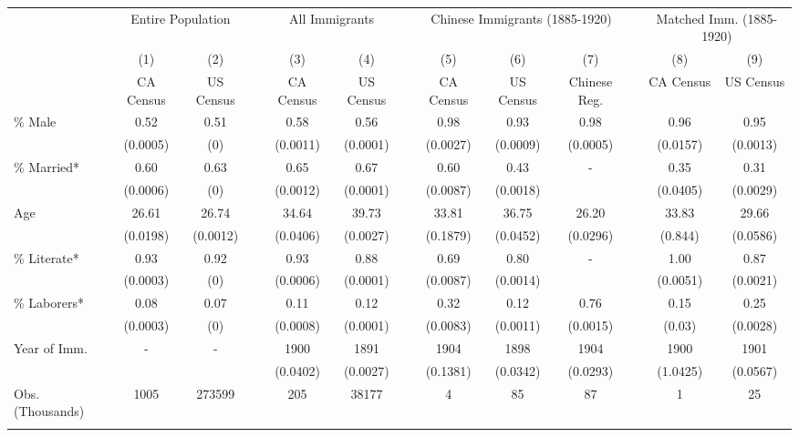 \begin{tabular}{lcccccccccccc}
\hhline{=============}
& \multicolumn{2}{c}{Entire Population} & & \multicolumn{2}{c}{All Immigrants} & & \multicolumn{3}{c}{Chinese Immigrants (1885-1920)} & & \multicolumn{2}{c}{Matched Imm. (1885-1920)} \\ 
\hhline{~--~--~---~--}
& (1) & (2) & & (3) & (4) & & (5) & (6) & (7) & & (8) & (9) \\ 
& CA Census & US Census & & CA Census & US Census & & CA Census & US Census & Chinese Reg. & & CA Census & US Census \\ 
 \hhline{-------------}
\% Male & 0.52&0.51&&0.58&0.56&&0.98&0.93&0.98&&0.96&0.95 \\ 
& (0.0005)&(0)&&(0.0011)&(0.0001)&&(0.0027)&(0.0009)&(0.0005)&&(0.0157)&(0.0013) \\ 
\% Married* & 0.60&0.63&&0.65&0.67&&0.60&0.43&-&&0.35&0.31 \\ 
& (0.0006)&(0)&&(0.0012)&(0.0001)&&(0.0087)&(0.0018)&&&(0.0405)&(0.0029) \\ 
Age & 26.61&26.74&&34.64&39.73&&33.81&36.75&26.20&&33.83&29.66 \\ 
& (0.0198)&(0.0012)&&(0.0406)&(0.0027)&&(0.1879)&(0.0452)&(0.0296)&&(0.844)&(0.0586) \\ 
\% Literate* & 0.93&0.92&&0.93&0.88&&0.69&0.80&-&&1.00&0.87 \\ 
& (0.0003)&(0)&&(0.0006)&(0.0001)&&(0.0087)&(0.0014)&&&(0.0051)&(0.0021) \\ 
\% Laborers* & 0.08&0.07&&0.11&0.12&&0.32&0.12&0.76&&0.15&0.25 \\ 
& (0.0003)&(0)&&(0.0008)&(0.0001)&&(0.0083)&(0.0011)&(0.0015)&&(0.03)&(0.0028) \\ 
Year of Imm. & -&-&&1900&1891&&1904&1898&1904&&1900&1901 \\ 
& &&&(0.0402)&(0.0027)&&(0.1381)&(0.0342)&(0.0293)&&(1.0425)&(0.0567) \\ 
Obs. (Thousands)
&
1005&273599&&205&38177&&4&85&87&&1&25
\\ 
\hhline{-------------}
\end{tabular}
